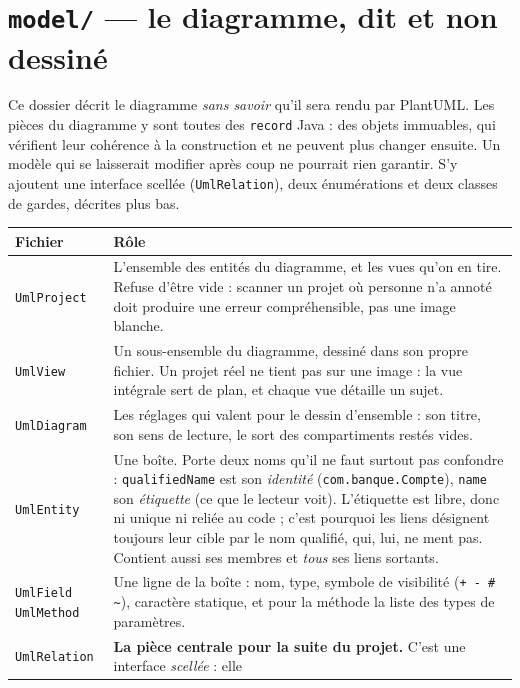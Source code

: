 \documentclass[12pt, a4paper]{article}
\begin{document}
\section{\texttt{model/} — le diagramme, dit et non dessiné}

Ce dossier décrit le diagramme \emph{sans savoir} qu'il sera rendu par PlantUML. Les pièces du
diagramme y sont toutes des \texttt{record} Java : des objets immuables, qui vérifient leur
cohérence à la construction et ne peuvent plus changer ensuite. Un modèle qui se laisserait
modifier après coup ne pourrait rien garantir. S'y ajoutent une interface scellée
(\texttt{UmlRelation}), deux énumérations et deux classes de gardes, décrites plus bas.

\begin{longtable}{L{4.2cm} L{10cm}}
\toprule
\textbf{Fichier} & \textbf{Rôle} \\
\midrule
\endhead
\texttt{UmlProject} &
L'ensemble des entités du diagramme, et les vues qu'on en tire. Refuse d'être vide : scanner un
projet où personne n'a annoté doit produire une erreur compréhensible, pas une image blanche. \\
\addlinespace
\texttt{UmlView} &
Un sous-ensemble du diagramme, dessiné dans son propre fichier. Un projet réel ne tient pas sur
une image : la vue intégrale sert de plan, et chaque vue détaille un sujet. \\
\addlinespace
\texttt{UmlDiagram} &
Les réglages qui valent pour le dessin d'ensemble : son titre, son sens de lecture, le sort des
compartiments restés vides. \\
\addlinespace
\texttt{UmlEntity} &
Une boîte. Porte deux noms qu'il ne faut surtout pas confondre : \texttt{qualifiedName} est son
\emph{identité} (\texttt{com.banque.Compte}), \texttt{name} son \emph{étiquette} (ce que le
lecteur voit). L'étiquette est libre, donc ni unique ni reliée au code ; c'est pourquoi les
liens désignent toujours leur cible par le nom qualifié, qui, lui, ne ment pas. Contient aussi
ses membres et \emph{tous} ses liens sortants. \\
\addlinespace
\texttt{UmlField} \newline \texttt{UmlMethod} &
Une ligne de la boîte : nom, type, symbole de visibilité (\texttt{+ - \# \textasciitilde}),
caractère statique, et pour la méthode la liste des types de paramètres. \\
\addlinespace
\texttt{UmlRelation} &
\textbf{La pièce centrale pour la suite du projet.} C'est une interface \emph{scellée} : elle

\end{longtable}
\end{document}
